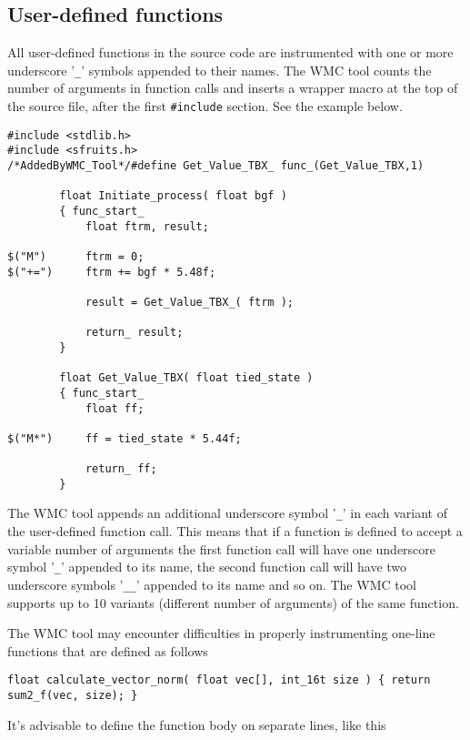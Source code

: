 \subsection{User-defined functions}

All user-defined functions in the source code are instrumented with one or more underscore '\verb|_|' symbols appended to their names. The WMC tool counts the number of arguments in function calls and inserts a wrapper macro at the top of the source file, after the first \verb|#include| section. See the example below.

\begin{Verbatim}[fontsize=\small]
#include <stdlib.h>
#include <sfruits.h>
/*AddedByWMC_Tool*/#define Get_Value_TBX_ func_(Get_Value_TBX,1)

        float Initiate_process( float bgf )
        { func_start_
            float ftrm, result;

$("M")      ftrm = 0;
$("+=")     ftrm += bgf * 5.48f;

            result = Get_Value_TBX_( ftrm );

            return_ result;
        }

        float Get_Value_TBX( float tied_state )
        { func_start_
            float ff;

$("M*")     ff = tied_state * 5.44f;

            return_ ff;
        }
\end{Verbatim}

The WMC tool appends an additional underscore symbol '\verb|_|' in each variant of the user-defined function call. This means that if a function is defined to accept a variable number of arguments the first function call will have one underscore symbol '\verb|_|' appended to its name, the second function call will have two underscore symbols '\verb|__|' appended to its name and so on. The WMC tool supports up to 10 variants (different number of arguments) of the same function.

The WMC tool may encounter difficulties in properly instrumenting one-line functions that are defined as follows

\begin{Verbatim}[fontsize=\small]
    float calculate_vector_norm( float vec[], int_16t size ) { return sum2_f(vec, size); }
\end{Verbatim}

It's advisable to define the function body on separate lines, like this

